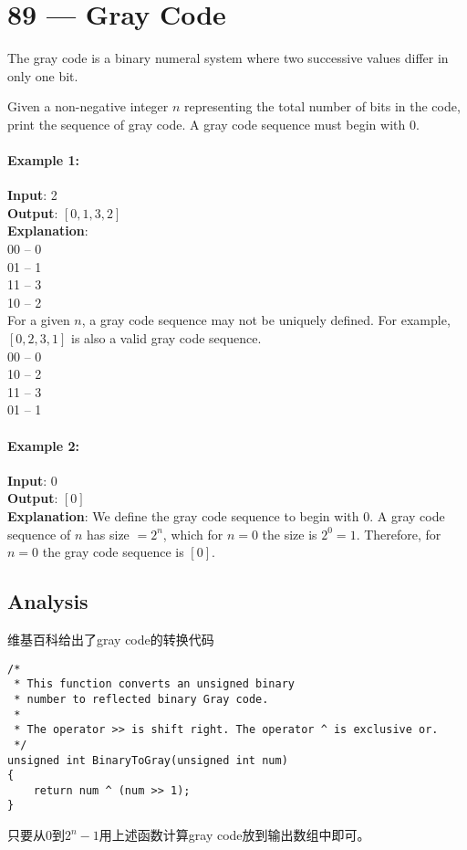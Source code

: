 \section{89 --- Gray Code}
The gray code is a binary numeral system where two successive values differ in only one bit.
\par
Given a non-negative integer $n$ representing the total number of bits in the code, print the sequence of gray code. A gray code sequence must begin with 0.
\paragraph{Example 1:}
\begin{flushleft}
\textbf{Input}: 2
\\
\textbf{Output}: $[0,1,3,2]$
\\
\textbf{Explanation}:
\\
00 -- 0
\\
01 -- 1
\\
11 -- 3
\\
10 -- 2
\\
For a given $n$, a gray code sequence may not be uniquely defined. For example, $[0,2,3,1]$ is also a valid gray code sequence.
\\
00 -- 0
\\
10 -- 2
\\
11 -- 3
\\
01 -- 1
\end{flushleft}
\paragraph{Example 2:}
\begin{flushleft}
\textbf{Input}: 0
\\
\textbf{Output}: $[0]$
\\
\textbf{Explanation}: We define the gray code sequence to begin with 0. A gray code sequence of $n$ has size $= 2^n$, which for $n = 0$ the size is $2^0 = 1$. Therefore, for $n = 0$ the gray code sequence is $[0]$.
\end{flushleft}
\subsection{Analysis}
维基百科给出了gray code的转换代码
\setcounter{lstlisting}{0}
\begin{lstlisting}[style=customc, caption={}]
/*
 * This function converts an unsigned binary
 * number to reflected binary Gray code.
 *
 * The operator >> is shift right. The operator ^ is exclusive or.
 */
unsigned int BinaryToGray(unsigned int num)
{
    return num ^ (num >> 1);
}
\end{lstlisting}
只要从0到$2^n-1$用上述函数计算gray code放到输出数组中即可。

